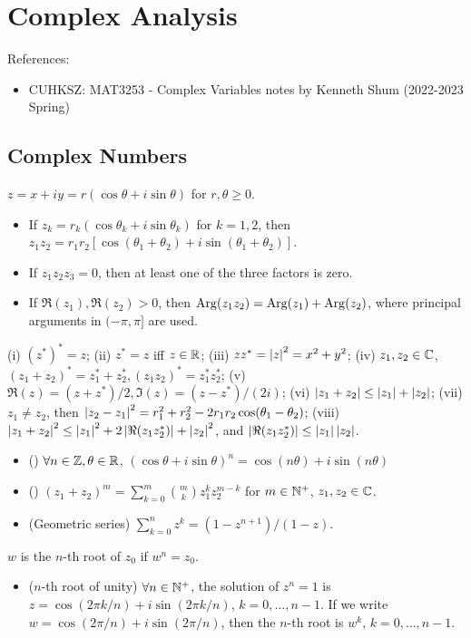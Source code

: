 \documentclass[10pt,a4paper]{book}
\begin{document}
	\MakeScribeTop
	\tableofcontents


\chapter{Complex Analysis}\label{chap:complex}
References: 
\begin{itemize}
	\item CUHKSZ: MAT3253 - Complex Variables notes by Kenneth Shum (2022-2023 Spring)
\end{itemize}

\section{Complex Numbers}\label{sec:complex-num}
\underline{} $z=x+iy=r(\cos\theta+i\sin\theta)$ for $r,\theta \geq 0$.
\begin{itemize}
	\item If $z_k=r_k(\cos\theta_k+i\sin\theta_k)$ for $k=1,2$, then $z_1z_2=r_1r_2[\cos(\theta_1+\theta_2)+i\sin(\theta_1+\theta_2)]$.   
	\item If $z_1z_2z_3=0$, then at least one of the three factors is zero. 
	\item If $\Re(z_1),\Re(z_2)>0$, then $\mathrm{Arg}(z_1z_2)=\mathrm{Arg}(z_1)+\mathrm{Arg}(z_2)$, where principal arguments in $(-\pi,\pi]$ are used.    
\end{itemize}   
\underline{} (i) $(z^*)^*=z$; (ii) $z^*=z$ iff $z\in\mathbb R$; (iii) $zz^*=\left\lvert z\right\rvert^2=x^2+y^2$; (iv) $z_1,z_2\in\mathbb C$, $(z_1+z_2)^*=z_1^*+z_2^*, (z_1z_2)^*=z_1^*z_2^*$; (v) $\Re(z)=(z+z^*)/2, \Im(z)=(z-z^*)/(2i)$; (vi) $\left\lvert z_1+z_2\right\rvert\leq \left\lvert z_1\right\rvert+\left\lvert z_2\right\rvert$; (vii) $z_1\neq z_2$, then $\left\lvert z_2-z_1\right\rvert^2 = r_1^2 + r_2^2 - 2r_1r_2\cos(\theta_1-\theta_2)$; (viii) $\left\lvert z_1+z_2\right\rvert^2\leq \left\lvert z_1\right\rvert^2 + 2\left\lvert\Re(z_1z_2^*)\right\rvert + \left\lvert z_2\right\rvert^2$, and $\left\lvert\Re (z_1z_2^*)\right\rvert\leq\left\lvert z_1\right\rvert\left\lvert z_2\right\rvert$.
\begin{itemize}
	\item () $\forall n\in\mathbb Z, \theta\in\mathbb R$, $(\cos\theta+i\sin\theta)^n=\cos(n\theta)+i\sin(n\theta)$ 
	\item () $(z_1+z_2)^m=\sum_{k=0}^{m}\binom{m}{k}z_1^kz_2^{m-k}$ for $m\in\mathbb N^+$, $z_1,z_2\in\mathbb C$.   
	\item (Geometric series) $\sum_{k=0}^{n}z^k=(1-z^{n+1})/(1-z)$.
\end{itemize}
\underline{} $w$ is the $n$-th root of $z_0$ if $w^n=z_0$.    
\begin{itemize}
	\item ($n$-th root of unity) $\forall n\in\mathbb N^+$, the solution of $z^n=1$ is $z=\cos(2\pi k/n)+i\sin(2\pi k/n)$, $k=0,\ldots,n-1$.
	If we write $w=\cos(2\pi/n)+i\sin(2\pi/n)$, then the $n$-th root is $w^k$, $k=0,\ldots,n-1$.       
\end{itemize}
\end{document}
